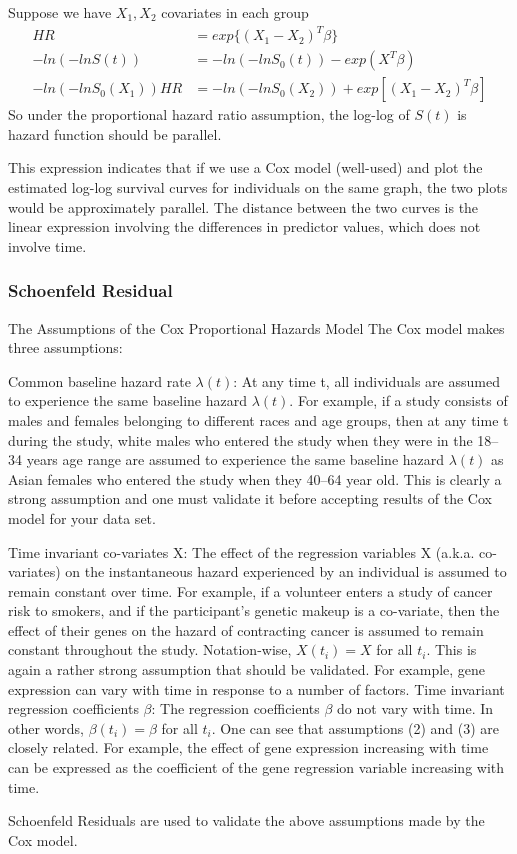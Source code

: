 \documentclass[11pt]{article} %
\begin{document}
Suppose we have $X_1, X_2$ covariates in each group
\begin{align*}
	HR & = exp \{( X_1 - X_2)^T \beta \}\\
	- ln(-ln S(t)) & = - ln(-ln S_0(t)) -exp(X^T\beta)\\
	- ln(-ln S_0(X_1)) HR &= - ln(-ln S_0(X_2))+ exp[(X_1 - X_2)^T\beta]
\end{align*}
So under the proportional hazard ratio assumption, the log-log of $S(t)$ is hazard function should be parallel. 

This expression indicates that if we use a Cox model (well-used) and plot the estimated log-log survival curves for individuals on the same graph, the two plots would be approximately parallel. The distance between the two curves is the linear expression involving the differences in predictor values, which does not involve time.

\subsubsection{Schoenfeld Residual}

The Assumptions of the Cox Proportional Hazards Model
The Cox model makes three assumptions:

Common baseline hazard rate $\lambda(t)$: At any time t, all individuals are assumed to experience the same baseline hazard $\lambda(t)$. For example, if a study consists of males and females belonging to different races and age groups, then at any time t during the study, white males who entered the study when they were in the 18–34 years age range are assumed to experience the same baseline hazard $\lambda(t)$ as Asian females who entered the study when they 40–64 year old. This is clearly a strong assumption and one must validate it before accepting results of the Cox model for your data set.

Time invariant co-variates X: The effect of the regression variables X (a.k.a. co-variates) on the instantaneous hazard experienced by an individual is assumed to remain constant over time. For example, if a volunteer enters a study of cancer risk to smokers, and if the participant’s genetic makeup is a co-variate, then the effect of their genes on the hazard of contracting cancer is assumed to remain constant throughout the study. Notation-wise, $X(t_i)=X$ for all $t_i$. This is again a rather strong assumption that should be validated. For example, gene expression can vary with time in response to a number of factors.
Time invariant regression coefficients $\beta$: The regression coefficients $\beta$ do not vary with time. In other words, $\beta(t_i) = \beta$ for all $t_i$. One can see that assumptions (2) and (3) are closely related. For example, the effect of gene expression increasing with time can be expressed as the coefficient of the gene regression variable increasing with time.

Schoenfeld Residuals are used to validate the above assumptions made by the Cox model.
\end{document}

